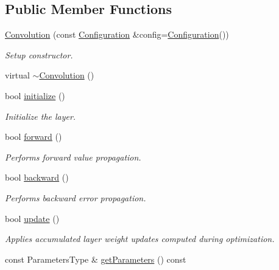 \subsection*{Public Member Functions}
\begin{DoxyCompactItemize}
\item 
\hyperlink{classffnn_1_1layer_1_1_convolution_af6a4efb533e86d240af67a976f9226de}{Convolution} (const \hyperlink{classffnn_1_1layer_1_1_convolution_1_1_configuration}{Configuration} \&config=\hyperlink{classffnn_1_1layer_1_1_convolution_1_1_configuration}{Configuration}())
\begin{DoxyCompactList}\small\item\em Setup constructor. \end{DoxyCompactList}\item 
virtual \hyperlink{classffnn_1_1layer_1_1_convolution_a12fa384c801699f967ecffcb66ce9c4c}{$\sim$\-Convolution} ()
\item 
bool \hyperlink{classffnn_1_1layer_1_1_convolution_a39ad1c05a0eac019e7c5c09a717dedca}{initialize} ()
\begin{DoxyCompactList}\small\item\em Initialize the layer. \end{DoxyCompactList}\item 
bool \hyperlink{classffnn_1_1layer_1_1_convolution_a86d3151b859c361501f83da01f53b3b9}{forward} ()
\begin{DoxyCompactList}\small\item\em Performs forward value propagation. \end{DoxyCompactList}\item 
bool \hyperlink{classffnn_1_1layer_1_1_convolution_a624f3e53008a42dd242f550d8c4ee914}{backward} ()
\begin{DoxyCompactList}\small\item\em Performs backward error propagation. \end{DoxyCompactList}\item 
bool \hyperlink{classffnn_1_1layer_1_1_convolution_a2d75dbeeff74a61dd8bb54accf56d5d9}{update} ()
\begin{DoxyCompactList}\small\item\em Applies accumulated layer weight updates computed during optimization. \end{DoxyCompactList}\item 
const Parameters\-Type \& \hyperlink{classffnn_1_1layer_1_1_convolution_ae558267ef378751f9b084f0eb4b61a12}{get\-Parameters} () const 
\end{DoxyCompactItemize}
